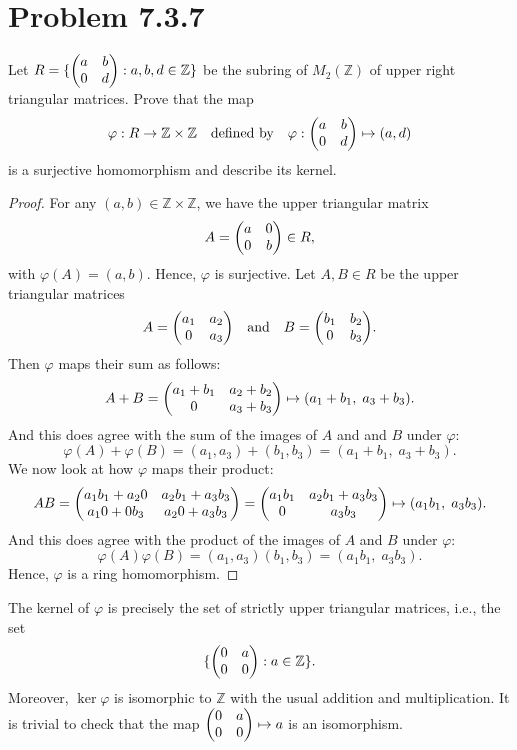 \documentclass[12pt]{article}
\newenvironment{problem}
    {\begin{lrbox}{\mybox}\begin{minipage}{0.98\textwidth}}
    {\end{minipage}\end{lrbox}\begin{center}\framebox[\textwidth]{\usebox{\mybox}}\end{center}}
\theoremstyle{definition}
\newcommand{\isp}[1]{\quad\text{#1}\quad}
\newcommand{\Z}{\mathbb{Z}}
\renewcommand{\phi}{\varphi}
\begin{document}
\newpage
\section{Problem 7.3.7}
\begin{problem}
    Let $R = \{\mqty(a & b \\ 0 & d) : a, b, d \in \Z\}$ be the subring of $M_2(\Z)$ of upper right triangular  matrices. Prove that the map
    \[
        \phi : R \to \Z \times \Z \isp{defined by} \phi : \mqty(a & b \\ 0 & d) \mapsto (a, d)
    \]
    is a surjective homomorphism and describe its kernel.
\end{problem}

\begin{proof}
    For any $(a, b) \in \Z \times \Z$, we have the upper triangular matrix
    \[
        A = \mqty(a & 0 \\ 0 & b) \in R,
    \]
    with $\phi(A) = (a, b)$. Hence, $\phi$ is surjective. Let $A, B \in R$ be the upper triangular matrices
    \[
        A = \mqty(a_1 & a_2 \\ 0 & a_3) \isp{and} B = \mqty(b_1 & b_2 \\ 0 & b_3).
    \]
    Then $\phi$ maps their sum as follows:
    \[
        A + B = \mqty(a_1 + b_1 & a_2 + b_2 \\ 0 & a_3 + b_3) \mapsto (a_1 + b_1,\; a_3 + b_3).
    \]
    And this does agree with the sum of the images of $A$ and and $B$ under $\phi$:
    \[
        \phi(A) + \phi(B) = (a_1, a_3) + (b_1, b_3) = (a_1 + b_1,\; a_3 + b_3).
    \]
    We now look at how $\phi$ maps their product:
    \[
        AB
            = \mqty(a_1b_1 + a_20 & a_2b_1 + a_3b_3 \\ a_10 + 0b_3 & a_20 + a_3b_3)
            = \mqty(a_1b_1 & a_2b_1 + a_3b_3 \\ 0 & a_3b_3)
            \mapsto (a_1b_1,\; a_3b_3).
    \]
    And this does agree with the product of the images of $A$ and $B$ under $\phi$:
    \[
        \phi(A)\phi(B) = (a_1, a_3)(b_1, b_3) = (a_1b_1,\; a_3b_3).
    \]
    Hence, $\phi$ is a ring homomorphism.
    
\end{proof}

The kernel of $\phi$ is precisely the set of strictly upper triangular matrices, i.e., the set
\[
    \{\mqty(0 & a \\ 0 & 0) : a \in \Z\}.
\]
Moreover, $\ker \phi$ is isomorphic to $\Z$ with the usual addition and multiplication. It is trivial to check that the map $\mqty(0 & a \\ 0 & 0) \mapsto a$ is an isomorphism.
\end{document}
